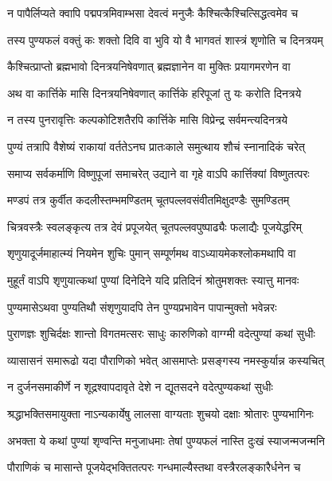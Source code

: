 \twolineshloka
{न पापैर्लिप्यते क्वापि पद्मपत्रमिवाम्भसा}
{देवत्वं मनुजैः कैश्चित्कैश्चित्सिद्धत्वमेव च} %

\twolineshloka
{तस्य पुण्यफलं वक्तुं कः शक्तो दिवि वा भुवि}
{यो वै भागवतं शास्त्रं शृणोति च दिनत्रयम्} %

\twolineshloka
{कैश्चित्प्राप्तो ब्रह्मभावो दिनत्रयनिषेवणात्}
{ब्रह्मज्ञानेन वा मुक्तिः प्रयागमरणेन वा} %

\twolineshloka
{अथ वा कार्त्तिके मासि दिनत्रयनिषेवणात्}
{कार्त्तिके हरिपूजां तु यः करोति दिनत्रये} %

\twolineshloka
{न तस्य पुनरावृत्तिः कल्पकोटिशतैरपि}
{कार्त्तिके मासि विप्रेन्द्र सर्वमन्त्यदिनत्रये} %

\twolineshloka
{पुण्यं तत्रापि वैशेष्यं राकायां वर्ततेऽनघ}
{प्रातःकाले समुत्थाय शौचं स्नानादिकं चरेत्} %

\twolineshloka
{समाप्य सर्वकर्माणि विष्णुपूजां समाचरेत्}
{उद्याने वा गृहे वाऽपि कार्त्तिक्यां विष्णुतत्परः} %

\twolineshloka
{मण्डपं तत्र कुर्वीत कदलीस्तम्भमण्डितम्}
{चूतपल्लवसंवीतमिक्षुदण्डैः सुमण्डितम्} %

\twolineshloka
{चित्रवस्त्रैः स्वलङ्कृत्य तत्र देवं प्रपूजयेत्}
{चूतपल्लवपुष्पाढ्यैः फलाद्यैः पूजयेद्धरिम्} %

\twolineshloka
{शृणुयादूर्जमाहात्म्यं नियमेन शुचिः पुमान्}
{सम्पूर्णमथ वाऽध्यायमेकश्लोकमथापि वा} %

\twolineshloka
{मुहूर्तं वाऽपि शृणुयात्कथां पुण्यां दिनेदिने}
{यदि प्रतिदिनं श्रोतुमशक्तः स्यात्तु मानवः} %

\twolineshloka
{पुण्यमासेऽथवा पुण्यतिथौ संशृणुयादपि}
{तेन पुण्यप्रभावेन पापान्मुक्तो भवेन्नरः} %

\twolineshloka
{पुराणज्ञः शुचिर्दक्षः शान्तो विगतमत्सरः}
{साधुः कारुणिको वाग्ग्मी वदेत्पुण्यां कथां सुधीः} %

\twolineshloka
{व्यासासनं समारूढो यदा पौराणिको भवेत्}
{आसमाप्तेः प्रसङ्गस्य नमस्कुर्यान्न कस्यचित्} %

\twolineshloka
{न दुर्जनसमाकीर्णे न शूद्रश्वापदावृते}
{देशे न द्यूतसदने वदेत्पुण्यकथां सुधीः} %

\twolineshloka
{श्रद्धाभक्तिसमायुक्ता नाऽन्यकार्येषु लालसा}
{वाग्यताः शुचयो दक्षाः श्रोतारः पुण्यभागिनः} %

\twolineshloka
{अभक्ता ये कथां पुण्यां शृण्वन्ति मनुजाधमाः}
{तेषां पुण्यफलं नास्ति दुःखं स्याजन्मजन्मनि} %

\twolineshloka
{पौराणिकं च मासान्ते पूजयेद्भक्तितत्परः}
{गन्धमाल्यैस्तथा वस्त्रैरलङ्कारैर्धनेन च} %


